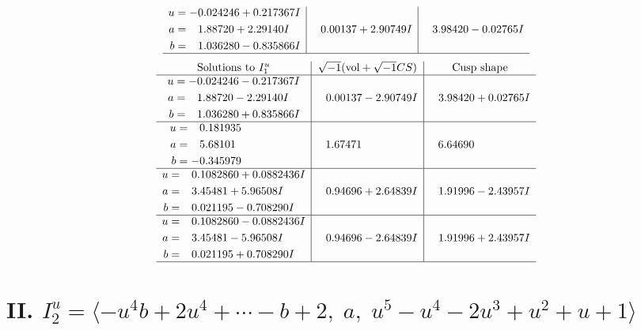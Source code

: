 \documentclass[1p]{elsarticle_modified}
\theoremstyle{definition}
\newcommand{\I}{\sqrt{-1}}
\begin{document}
$$\begin{array}{c|c|c}
\begin{aligned}
u &= -0.024246 + 0.217367 I \\
a &= \phantom{-}1.88720 + 2.29140 I \\
b &= \phantom{-}1.036280 - 0.835866 I\end{aligned}
 & \phantom{-}0.00137 + 2.90749 I & \phantom{-}3.98420 - 0.02765 I\\
 \hline 
 \end{array}$$\newpage$$\begin{array}{c|c|c}  
\text{Solutions to }I^u_{1}& \I (\text{vol} + \sqrt{-1}CS) & \text{Cusp shape}\\
 \hline 
\begin{aligned}
u &= -0.024246 - 0.217367 I \\
a &= \phantom{-}1.88720 - 2.29140 I \\
b &= \phantom{-}1.036280 + 0.835866 I\end{aligned}
 & \phantom{-}0.00137 - 2.90749 I & \phantom{-}3.98420 + 0.02765 I \\ \hline\begin{aligned}
u &= \phantom{-}0.181935\phantom{ +0.000000I} \\
a &= \phantom{-}5.68101\phantom{ +0.000000I} \\
b &= -0.345979\phantom{ +0.000000I}\end{aligned}
 & \phantom{-}1.67471\phantom{ +0.000000I} & \phantom{-}6.64690\phantom{ +0.000000I} \\ \hline\begin{aligned}
u &= \phantom{-}0.1082860 + 0.0882436 I \\
a &= \phantom{-}3.45481 + 5.96508 I \\
b &= \phantom{-}0.021195 - 0.708290 I\end{aligned}
 & \phantom{-}0.94696 + 2.64839 I & \phantom{-}1.91996 - 2.43957 I \\ \hline\begin{aligned}
u &= \phantom{-}0.1082860 - 0.0882436 I \\
a &= \phantom{-}3.45481 - 5.96508 I \\
b &= \phantom{-}0.021195 + 0.708290 I\end{aligned}
 & \phantom{-}0.94696 - 2.64839 I & \phantom{-}1.91996 + 2.43957 I\\
 \hline 
 \end{array}$$\newpage\newpage\renewcommand{\arraystretch}{1}
\centering \section*{II. $I^u_{2}= \langle - u^4 b+2 u^4+\cdots- b+2,\;a,\;u^5- u^4-2 u^3+u^2+u+1 \rangle$}
\end{document}
